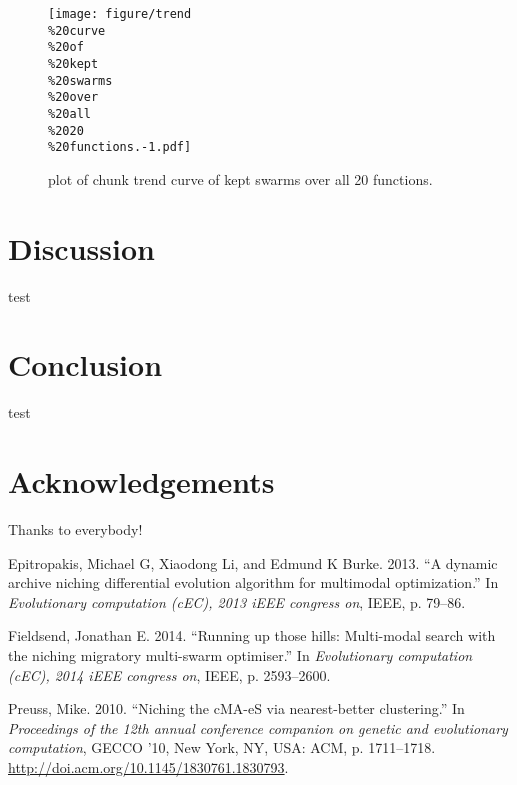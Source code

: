 \documentclass[12pt,a4paper]{article}
\begin{document}
\begin{figure}[htbp]
\centering
\texttt{[image: figure/trend\\\%20curve\\\%20of\\\%20kept\\\%20swarms\\\%20over\\\%20all\\\%2020\\\%20functions.-1.pdf]}
\caption{plot of chunk trend curve of kept swarms over all 20
functions.}
\end{figure}

\section{Discussion}\label{discussion}

test

\section{Conclusion}\label{conclusion}

test

\section{Acknowledgements}\label{acknowledgements}

Thanks to everybody! \newpage

\hypertarget{refs}{}
\hypertarget{ref-epitropakisux5f2013}{}
Epitropakis, Michael G, Xiaodong Li, and Edmund K Burke. 2013. ``A
dynamic archive niching differential evolution algorithm for multimodal
optimization.'' In \emph{Evolutionary computation (cEC), 2013 iEEE
congress on}, IEEE, p. 79--86.

\hypertarget{ref-fieldsendux5f2014}{}
Fieldsend, Jonathan E. 2014. ``Running up those hills: Multi-modal
search with the niching migratory multi-swarm optimiser.'' In
\emph{Evolutionary computation (cEC), 2014 iEEE congress on}, IEEE, p.
2593--2600.

\hypertarget{ref-preussux5f2010}{}
Preuss, Mike. 2010. ``Niching the cMA-eS via nearest-better
clustering.'' In \emph{Proceedings of the 12th annual conference
companion on genetic and evolutionary computation}, GECCO '10, New York,
NY, USA: ACM, p. 1711--1718.
\url{http://doi.acm.org/10.1145/1830761.1830793}.
\end{document}
